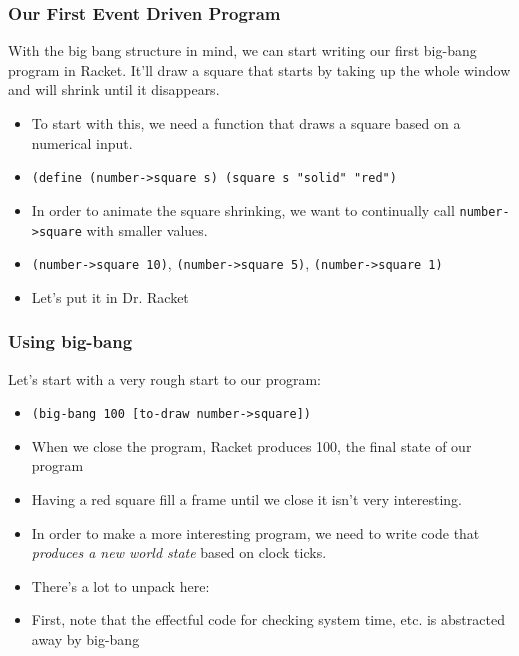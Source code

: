\documentclass{beamer}
\begin{document}
\begin{frame}
  \frametitle{Our First Event Driven Program}
  With the big bang structure in mind, we can start writing our first big-bang
  program in Racket. It'll draw a square that starts by taking up the whole
  window and will shrink until it disappears.

  \begin{itemize}
  \item<2-> To start with this, we need a function
    that draws a square based on a numerical input.
  \item<3-> \texttt{(define (number->square s) (square s "solid" "red")}
  \item<4-> In order to animate the square shrinking, we want to continually
    call \texttt{number->square} with smaller values.
  \item<5-> \texttt{(number->square 10)},  \texttt{(number->square 5)}, \texttt{(number->square 1)}
  \item<6-> Let's put it in Dr. Racket
  \end{itemize}
\end{frame}


\begin{frame}
  \frametitle{Using big-bang}
  Let's start with a very rough start to our program:
  \begin{itemize}
  \item<2-> \texttt{(big-bang 100 [to-draw number->square])}
  \item<3-> When we close the program, Racket produces 100, the final state
    of our program
  \item<4-> Having a red square fill a frame until we close it isn't very interesting.
  \item<5-> In order to make a more interesting program, we need to write code
    that \emph{produces a new world state} based on clock ticks.
  \item<6-> There's a lot to unpack here:
    \firstBigBang
  \item<7-> First, note that the effectful code for checking system time, etc.
    is abstracted away by big-bang
  \end{itemize}
\end{frame}
\end{document}

